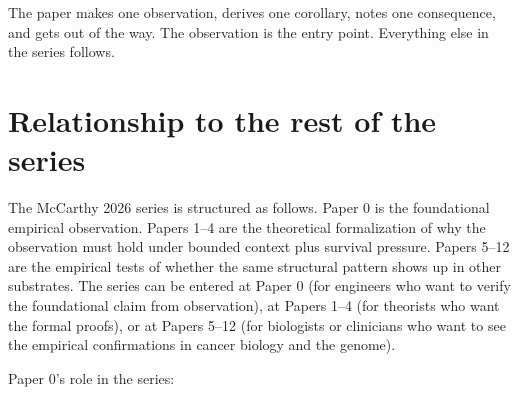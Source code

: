 \documentclass[11pt]{article}
\begin{document}
The paper makes one observation, derives one corollary, notes one consequence, and gets out of the way. The observation is the entry point. Everything else in the series follows.

\section{Relationship to the rest of the series}
\label{sec:series}

The McCarthy 2026 series is structured as follows. Paper 0 is the foundational empirical observation. Papers 1--4 are the theoretical formalization of why the observation must hold under bounded context plus survival pressure. Papers 5--12 are the empirical tests of whether the same structural pattern shows up in other substrates. The series can be entered at Paper 0 (for engineers who want to verify the foundational claim from observation), at Papers 1--4 (for theorists who want the formal proofs), or at Papers 5--12 (for biologists or clinicians who want to see the empirical confirmations in cancer biology and the genome).

Paper 0's role in the series:
\end{document}
